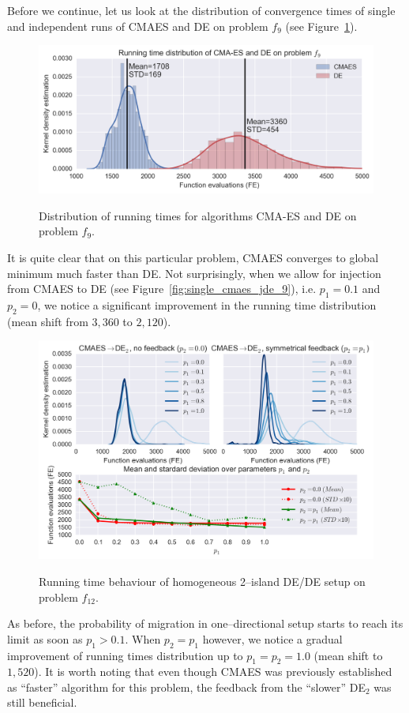 \documentclass{sig-alternate}
\begin{document}
Before we continue, let us look at the distribution of convergence times of single and independent runs of CMAES and DE on problem $f_9$ (see Figure~\ref{fig:distr_cmaes_jde_9}).
\begin{figure}[ht]
    \centering
    \includegraphics[width=\columnwidth]{figures/single_distr_cmaes_jde_9.png}
    \label{fig:distr_cmaes_jde_9}
    \caption{Distribution of running times for algorithms CMA-ES and DE on problem $f_9$.}
\end{figure}
It is quite clear that on this particular problem, CMAES converges to global minimum much faster than DE.
Not surprisingly, when we allow for injection from CMAES to DE (see Figure~\ref{fig:single_cmaes_jde_9}), i.e. $p_1=0.1$ and $p_2=0$, we notice a significant improvement in the running time distribution (mean shift from $3,360$ to $2,120$).
\begin{figure}[ht]
  \centering
  \includegraphics[width=\columnwidth]{figures/single_cmaes_jde_9.png}
  \label{fig:single_jde_jde_9}
 \caption{Running time behaviour of homogeneous 2--island DE/DE setup on problem $f_{12}$.}
\end{figure}
As before, the probability of migration in one--directional setup starts to reach its limit as soon as $p_1 > 0.1$.
When $p_2 = p_1$ however, we notice a gradual improvement of running times distribution up to $p_1=p_2=1.0$ (mean shift to $1,520$).
It is worth noting that even though CMAES was previously established as ``faster'' algorithm for this problem, the feedback from the ``slower'' DE$_2$ was still beneficial.
\end{document}

